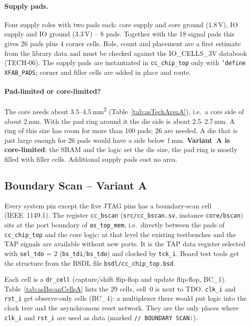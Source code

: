 \paragraph{Supply pads.}
Four supply roles with two pads each: core supply and core ground
(1.8\,V), IO supply and IO ground (3.3\,V) -- 8 pads. Together with the
18 signal pads this gives 26 pads plus 4 corner cells. Role, count and
placement are a first estimate from the library data and must be checked
against the IO\_CELLS\_3V databook (TECH-06). The supply pads are
instantiated in \texttt{cc\_chip\_top} only with \texttt{`define XFAB\_PADS};
corner and filler cells are added in place and route.

\paragraph{Pad-limited or core-limited?}
The core needs about 3.5--4.5\,mm\textsuperscript{2}
(Table~\ref{tab:asTechAreaA}), i.e.\ a core side of about 2\,mm. With the
pad ring around it the die side is about 2.5--2.7\,mm. A ring of this size
has room for more than 100 pads; 26 are needed.
A die that is just large enough for 26 pads would have a side below 1\,mm.
\textbf{Variant~A is core-limited}: the SRAM and the logic set the die size,
the pad ring is mostly filled with filler cells. Additional supply pads
cost no area.

\subsection{Boundary Scan -- Variant A}
\label{subsec:bscanA}

Every system pin except the five JTAG pins has a boundary-scan cell
(IEEE~1149.1). The register \texttt{cc\_bscan} (\texttt{src/cc\_bscan.sv},
instance \texttt{core/bscan}) sits at the port boundary of
\texttt{as\_top\_mem}, i.e.\ directly between the pads of
\texttt{cc\_chip\_top} and the core logic; at that level the existing
testbenches and the TAP signals are available without new ports.
It is the TAP data register selected with \texttt{sel\_tdo} = 2
(\texttt{bs\_tdi}/\texttt{bs\_tdo}) and clocked by \texttt{tck\_i}.
Board test tools get the structure from the BSDL file
\texttt{bsdl/cc\_chip\_top.bsd}.

Each cell is a \texttt{dr\_cell} (capture/shift flip-flop and update
flip-flop, BC\_1). Table~\ref{tab:asBscanCellsA} lists the 29 cells, cell~0
is next to TDO.
\texttt{clk\_i} and \texttt{rst\_i} get observe-only cells (BC\_4): a
multiplexer there would put logic into the clock tree and the asynchronous
reset network. They are the only places where \texttt{clk\_i} and
\texttt{rst\_i} are used as data (marked \texttt{// BOUNDARY SCAN:}).

